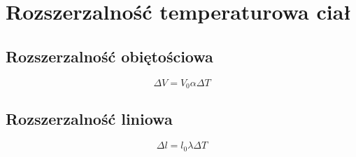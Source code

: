   \section{Rozszerzalność temperaturowa ciał}
    \subsection{Rozszerzalność obiętościowa}
      \begin{equation}
        \Delta V = V_0\alpha\Delta T
      \end{equation}
    \subsection{Rozszerzalność liniowa}
      \begin{equation}
        \Delta l = l_0\lambda\Delta T
      \end{equation}
